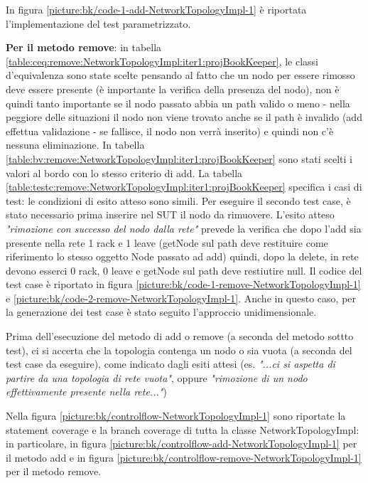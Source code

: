 \documentclass[10pt, a4paper]{article}
\newcommand{\gettablelabel}[5]{table:#1:#2:#3:iter#4:proj#5}
\newcommand{\getpicturelabel}[1]{picture:#1}
\def\bookkeeper{BookKeeper}
\begin{document}
	In figura \ref{\getpicturelabel{bk/code-1-add-NetworkTopologyImpl-1}} è riportata l'implementazione del
	test parametrizzato.
	
	\textbf{Per il metodo remove}: in tabella \ref{\gettablelabel{ceq}{remove}{NetworkTopologyImpl}{1}
	{\bookkeeper}}, le classi d'equivalenza sono state scelte pensando al fatto che un nodo per essere
	rimosso deve essere presente (è importante la verifica della presenza del nodo), non è quindi tanto 
	importante se il nodo passato abbia un path valido
	o meno - nella peggiore delle situazioni il nodo non viene trovato anche se il path è invalido (add 
	effettua validazione - se fallisce, il nodo non verrà inserito) e quindi non c'è nessuna 
	eliminazione.
	In tabella \ref{\gettablelabel{bv}{remove}{NetworkTopologyImpl}{1}{\bookkeeper}} sono stati scelti i valori al
	bordo con lo stesso criterio di add.
	La tabella \ref{\gettablelabel{testc}{remove}{NetworkTopologyImpl}{1}{\bookkeeper}} specifica i casi di test:
	le condizioni di esito atteso sono simili. Per eseguire il secondo test case, è stato necessario
	prima inserire nel SUT il nodo da rimuovere. L'esito atteso \textit{"rimozione con successo
	del nodo dalla rete"} prevede la verifica che dopo l'add sia presente nella rete 1 rack e 1 leave 
	(getNode sul path deve restituire come riferimento lo stesso oggetto Node passato ad add)
	quindi, dopo la delete, in rete devono esserci 0 rack, 0 leave e getNode sul path deve restiutire 
	null. Il codice del test case è riportato in figura \ref{\getpicturelabel{bk/code-1-remove-NetworkTopologyImpl-1}}
	e \ref{\getpicturelabel{bk/code-2-remove-NetworkTopologyImpl-1}}. Anche in questo caso, per la
	generazione dei test case è stato seguito l'approccio unidimensionale.
	
	Prima dell'esecuzione del metodo di add o remove (a seconda del metodo sottto test), ci si accerta 	
	che la topologia contenga un nodo o sia vuota (a seconda del test case da eseguire), come indicato
	dagli esiti attesi (es. \textit{"...ci si aspetta di partire da una topologia di rete vuota"}, 
	oppure \textit{"rimozione di un nodo effettivamente presente nella rete..."})
		
	Nella figura \ref{\getpicturelabel{bk/controlflow-NetworkTopologyImpl-1}} sono riportate la
	statement coverage e la branch coverage di tutta la classe NetworkTopologyImpl: in particolare,
	in figura \ref{\getpicturelabel{bk/controlflow-add-NetworkTopologyImpl-1}} per il metodo add e in
	figura \ref{\getpicturelabel{bk/controlflow-remove-NetworkTopologyImpl-1}} per il metodo remove.
	
\end{document}
